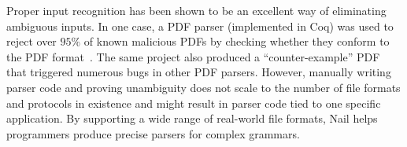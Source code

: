 

Proper input recognition has been shown to be an excellent way of
eliminating ambiguous inputs.  In one case, a PDF parser (implemented
in Coq) was used to reject over $95\%$ of known malicious PDFs by checking
whether they conform to the PDF format~\cite{Bogk-PDF}. The same project
also produced a ``counter-example'' PDF that triggered numerous bugs
in other PDF parsers. However, manually writing parser code and proving
unambiguity does not scale to the number of file formats and protocols
in existence and might result in parser code tied to one specific
application. By supporting a wide range of real-world file formats,
Nail helps programmers produce precise parsers for complex grammars.


